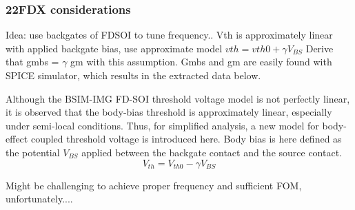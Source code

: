			\FloatBarrier
	\subsubsection{22FDX considerations}
		Idea: use backgates of FDSOI to tune frequency..
		Vth is approximately linear with applied backgate bias, use approximate model $vth = vth0 + \gamma V_{BS}$
		Derive that gmbs = $\gamma$ gm with this assumption. Gmbs and gm are easily found with SPICE simulator, which results in the extracted data below. 

		Although the BSIM-IMG FD-SOI threshold voltage model is not perfectly linear, it is observed that the body-bias threshold is approximately linear, especially under semi-local conditions. Thus, for simplified analysis, a new model for body-effect coupled threshold voltage is introduced here. Body bias is here defined as the potential $V_{BS}$ applied between the backgate contact and the source contact. 
		\begin{equation}
		V_{th} = V_{th0} - \gamma V_{BS}
		\end{equation}

		Might be challenging to achieve proper frequency and sufficient FOM, unfortunately....

